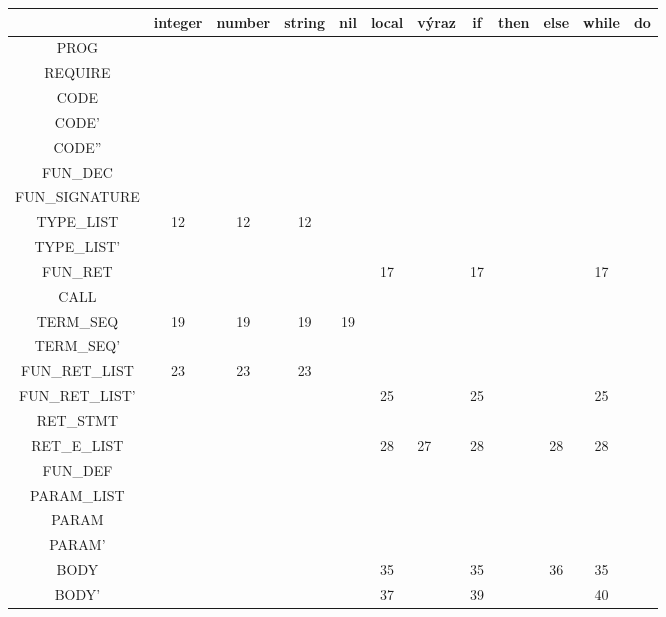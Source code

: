 \documentclass[11pt,a4paper]{article}
\begin{document}
        \begin{table}
        \begin{tabular}{|c|c|c|c|c|c|l|c|c|c|c|c|}
        \hline
         & integer & number & string & nil & local & výraz & if & then & else & while & do \\ \hline
        PROG &  &  &  &  &  &  &  &  &  &  &  \\ \hline
        REQUIRE &  &  &  &  &  &  &  &  &  &  &  \\ \hline
        CODE &  &  &  &  &  &  &  &  &  &  &  \\ \hline
        CODE' &  &  &  &  &  &  &  &  &  &  &  \\ \hline
        CODE'' &  &  &  &  &  &  &  &  &  &  &  \\ \hline
        FUN\_DEC &  &  &  &  &  &  &  &  &  &  &  \\ \hline
        FUN\_SIGNATURE &  &  &  &  &  &  &  &  &  &  &  \\ \hline
        TYPE\_LIST & 12 & 12 & 12 &  &  &  &  &  &  &  &  \\ \hline
        TYPE\_LIST' &  &  &  &  &  &  &  &  &  &  &  \\ \hline
        FUN\_RET &  &  &  &  & 17 &  & 17 &  &  & 17 &  \\ \hline
        CALL &  &  &  &  &  &  &  &  &  &  &  \\ \hline
        TERM\_SEQ & 19 & 19 & 19 & 19 &  &  &  &  &  &  &  \\ \hline
        TERM\_SEQ' &  &  &  &  &  &  &  &  &  &  &  \\ \hline
        FUN\_RET\_LIST & 23 & 23 & 23 &  &  &  &  &  &  &  &  \\ \hline
        FUN\_RET\_LIST' &  &  &  &  & 25 &  & 25 &  &  & 25 &  \\ \hline
        RET\_STMT &  &  &  &  &  &  &  &  &  &  &  \\ \hline
        RET\_E\_LIST &  &  &  &  & 28 & 27 & 28 &  & 28 & 28 &  \\ \hline
        FUN\_DEF &  &  &  &  &  &  &  &  &  &  &  \\ \hline
        PARAM\_LIST &  &  &  &  &  &  &  &  &  &  &  \\ \hline
        PARAM &  &  &  &  &  &  &  &  &  &  &  \\ \hline
        PARAM' &  &  &  &  &  &  &  &  &  &  &  \\ \hline
        BODY &  &  &  &  & 35 &  & 35 &  & 36 & 35 &  \\ \hline
        BODY' &  &  &  &  & 37 &  & 39 &  &  & 40 &  \\ \hline

\end{tabular}
\end{table}
\end{document}
